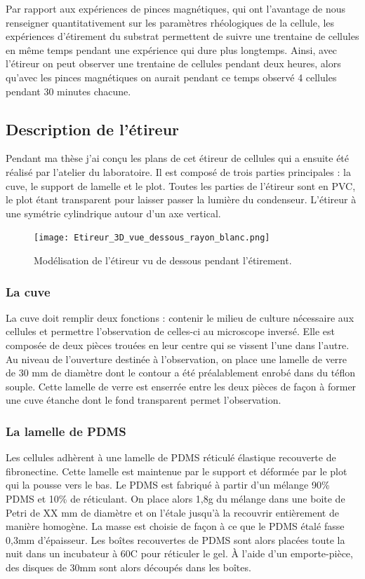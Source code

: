 	Par rapport aux expériences de pinces magnétiques, qui ont l'avantage de nous renseigner quantitativement sur les paramètres rhéologiques de la cellule, les expériences d'étirement du substrat permettent de suivre une trentaine de cellules en même temps pendant une expérience qui dure plus longtemps. Ainsi, avec l'étireur on peut observer une trentaine de cellules pendant deux heures, alors qu'avec les pinces magnétiques on aurait pendant ce temps observé 4 cellules pendant 30 minutes chacune. 
	
	\subsection{Description de l'étireur}
	Pendant ma thèse j'ai conçu les plans de cet étireur de cellules qui a ensuite été réalisé par l'atelier du laboratoire. Il est composé de trois parties principales : la cuve, le support de lamelle et le plot. Toutes les parties de l'étireur sont en PVC, le plot étant transparent pour laisser passer la lumière du condenseur. L'étireur à une symétrie cylindrique autour d'un axe vertical. 
	\begin{figure}
	\texttt{[image: Etireur\_3D\_vue\_dessous\_rayon\_blanc.png]}
	\caption{Modélisation de l'étireur vu de dessous pendant l'étirement.}
	\end{figure}
	\subsubsection{La cuve}
	La cuve doit remplir deux fonctions : contenir le milieu de culture nécessaire aux cellules et permettre l'observation de celles-ci au microscope inversé. Elle est composée de deux pièces trouées en leur centre qui se vissent l'une dans l'autre. Au niveau de l'ouverture destinée à l'observation, on place une lamelle de verre de 30 mm de diamètre dont le contour a été préalablement enrobé dans du téflon souple. Cette lamelle de verre est enserrée entre les deux pièces de façon à former une cuve étanche dont le fond transparent permet l'observation.
	\subsubsection{La lamelle de PDMS} 
	Les cellules adhèrent à une lamelle de PDMS réticulé élastique recouverte de fibronectine. Cette lamelle est maintenue par le support et déformée par le plot qui la pousse vers le bas. 
	Le PDMS est fabriqué à partir d'un mélange 90\% PDMS et 10\% de réticulant. On place alors 1,8g du mélange dans une boite de Petri de XX mm de diamètre et on l'étale jusqu'à la recouvrir entièrement de manière homogène. La masse est choisie de façon à ce que le PDMS étalé fasse 0,3mm d'épaisseur. Les boîtes recouvertes de PDMS sont alors placées toute la nuit dans un incubateur à 60\degres  C pour réticuler le gel. À l'aide d'un emporte-pièce, des disques de 30mm sont alors découpés dans les boîtes.

